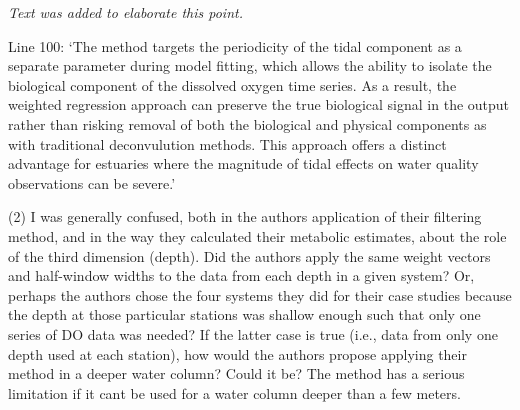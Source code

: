 \documentclass[letterpaper,12pt]{article}\usepackage[]{graphicx}\usepackage[]{color}
\begin{document}
{\it Text was added to elaborate this point.

Line 100: `The method targets the periodicity of the tidal component as a separate parameter during model fitting, which allows the ability to isolate the biological component of the dissolved oxygen time series.  As a result, the weighted regression approach can preserve the true biological signal in the output rather than risking removal of both the biological and physical components as with traditional deconvulution methods.  This approach offers a distinct advantage for estuaries where the magnitude of tidal effects on water quality observations can be severe.'
}

(2) I was generally confused, both in the authors application of their filtering method, and in the way they calculated their metabolic estimates, about the role of the third dimension (depth). Did the authors apply the same weight vectors and half-window widths to the data from each depth in a given system? Or, perhaps the authors chose the four systems they did for their case studies because the depth at those particular stations was shallow enough such that only one series of DO data was needed? If the latter case is true (i.e., data from only one depth used at each station), how would the authors propose applying their method in a deeper water column? Could it be? The method has a serious limitation if it cant be used for a water column deeper than a few meters.
\end{document}
